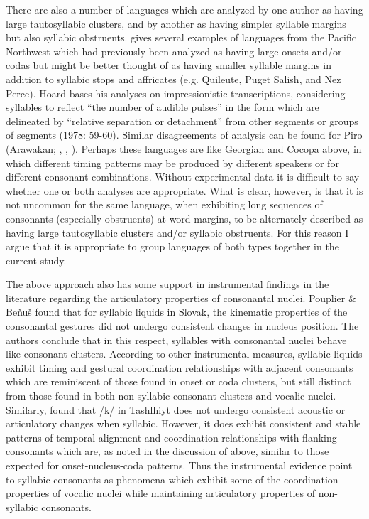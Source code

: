   There are also a number of languages which are analyzed by one author as having large tautosyllabic clusters, and by another as having simpler syllable margins but also syllabic obstruents. \citet{Hoard1978} gives several examples of languages from the Pacific Northwest which had previously been analyzed as having large onsets and/or codas but might be better thought of as having smaller syllable margins in addition to syllabic stops and affricates (e.g. Quileute, Puget Salish, and Nez Perce). Hoard bases his analyses on impressionistic transcriptions, considering syllables to reflect “the number of audible pulses” in the form which are delineated by “relative separation or detachment” from other segments or groups of segments (1978: 59-60). Similar disagreements of analysis can be found for Piro (Arawakan; \citealt{Matteson1965}, \citealt{Lin1997}, \citealt{Hanson2010}). Perhaps these languages are like Georgian and Cocopa above, in which different timing patterns may be produced by different speakers or for different consonant combinations. Without experimental data it is difficult to say whether one or both analyses are appropriate. What is clear, however, is that it is not uncommon for the same language, when exhibiting long sequences of consonants (especially obstruents) at word margins, to be alternately described as having large tautosyllabic clusters and/or syllabic obstruents. For this reason I argue that it is appropriate to group languages of both types together in the current study.

  The above approach also has some support in instrumental findings in the literature regarding the articulatory properties of consonantal nuclei. Pouplier \& Beňuš  found that for syllabic liquids in Slovak, the kinematic properties of the consonantal gestures did not undergo consistent changes in nucleus position. The authors conclude that in this respect, syllables with consonantal nuclei behave like consonant clusters. According to other instrumental measures, syllabic liquids exhibit timing and gestural coordination relationships with adjacent consonants which are reminiscent of those found in onset or coda clusters, but still distinct from those found in both non-syllabic consonant clusters and vocalic nuclei. Similarly, \citet{FougeronRidouane2008} found that /k/ in Tashlhiyt does not undergo consistent acoustic or articulatory changes when syllabic. However, it does exhibit consistent and stable patterns of temporal alignment and coordination relationships with flanking consonants which are, as noted in the discussion of \citet{GoldsteinEtAl2007} above, similar to those expected for onset-nucleus-coda patterns. Thus the instrumental evidence point to syllabic consonants as phenomena which exhibit some of the coordination properties of vocalic nuclei while maintaining articulatory properties of non-syllabic consonants.

